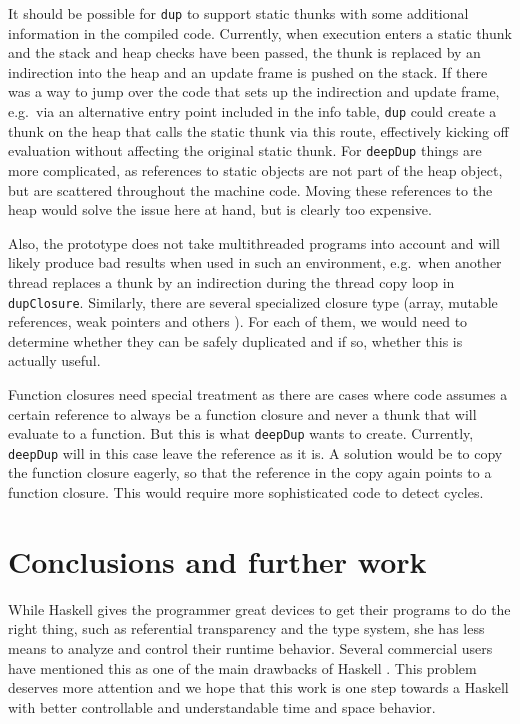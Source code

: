 \documentclass[preprint]{sigplanconf}
\theoremstyle{nonumberplain}
\newcommand{\li}{\lstinline[style=Haskell]}
\newcommand{\ci}{\lstinline[style=Cmm]}
\begin{document}
It should be possible for \li-dup- to support static thunks with some additional information in the compiled code.  Currently, when execution enters a static thunk and the stack and heap checks have been passed, the thunk is replaced by an indirection into the heap and an update frame is pushed on the stack. If there was a way to jump over the code that sets up the indirection and update frame, e.g.\ via an alternative entry point included in the info table, \li-dup- could create a thunk on the heap that calls the static thunk via this route, effectively kicking off evaluation without affecting the original static thunk.  For \li-deepDup- things are more complicated, as references to static objects are not part of the heap object, but are scattered throughout the machine code. Moving these references to the heap would solve the issue here at hand, but is clearly too expensive.

Also, the prototype does not take multithreaded programs into account and will likely produce bad results when used in such an environment, e.g.\ when another thread replaces a thunk by an indirection during the thread copy loop in \ci-dupClosure-. Similarly, there are several specialized closure type (array, mutable references, weak pointers and others \citep[page HeapObjects]{commentary}). For each of them, we would need to determine whether they can be safely duplicated and if so, whether this is actually useful.

Function closures need special treatment as there are cases where code assumes a certain reference to always be a function closure and never a thunk that will evaluate to a function. But this is what \li-deepDup- wants to create. Currently, \li-deepDup- will in this case leave the reference as it is. A solution would be to copy the function closure eagerly, so that the reference in the copy again points to a function closure. This would require more sophisticated code to detect cycles. 

\section{Conclusions and further work}

While Haskell gives the programmer great devices to get their programs to do the right thing, such as referential transparency and the type system, she has less means to analyze and control their runtime behavior. Several commercial users have mentioned this as one of the main drawbacks of Haskell \citep{sampson,wehr,hesselink}. This problem deserves more attention and we hope that this work is one step towards a Haskell with better controllable and understandable time and space behavior.
\end{document}
